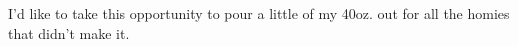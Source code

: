 I'd like to take this opportunity to pour a little of my 40oz. out for all
the homies that didn't make it.
